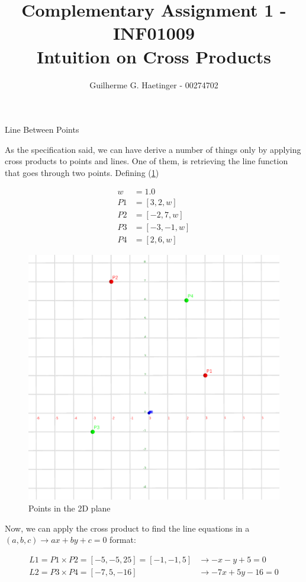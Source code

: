 \documentclass[twocolumn]{article}
\title{Complementary Assignment 1 - INF01009 \\ Intuition on Cross Products}
\author{Guilherme G. Haetinger - 00274702}
\begin{document}
  \maketitle

    \begin{section}{Line Between Points}

      As the specification said, we can have derive a number of things only by
applying cross products to points and lines. One of them, is retrieving the line
function that goes through two points. Defining (\cref{fig:points})

      \begin{align*}
        w &= 1.0 \\
        P1 &= [3, 2, w] \\
        P2 &= [-2, 7, w] \\
        P3 &= [-3, -1, w] \\
        P4 &= [2, 6, w]
      \end{align*}

      \begin{figure}
        \centering
        \includegraphics[width=0.85\linewidth]{./res/1.png}
        \caption{Points in the 2D plane}
        \label{fig:points}
      \end{figure}

      Now, we can apply the cross product to find the line equations in a $(a,
b, c) \to ax + by + c = 0$ format:

      \begin{align*}
        L1 = P1 \times P2 = [-5, -5, 25] = [-1, -1, 5] &\to -x -y + 5 = 0 \\
        L2 = P3 \times P4 = [-7, 5, -16] &\to -7x + 5y - 16 = 0
      \end{align*}


\end{section}
\end{document}
